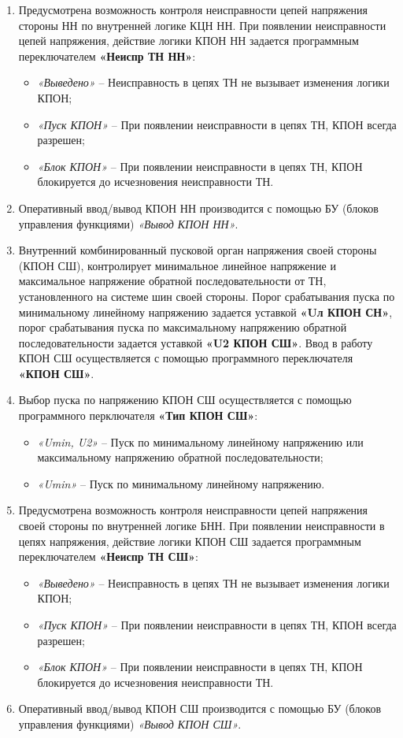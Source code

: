 \begin{enumerate}
\item
Предусмотрена возможность контроля неисправности цепей напряжения стороны НН по внутренней логике КЦН НН. При появлении неисправности цепей напряжения, действие логики КПОН НН задается программным переключателем \textbf{«Неиспр ТН НН»}:
\begin{itemize}
\item \textit{«Выведено»} -- Неисправность в цепях ТН не вызывает изменения логики КПОН;
\item \textit{«Пуск КПОН»} -- При появлении неисправности в цепях ТН, КПОН всегда разрешен;
\item \textit{«Блок КПОН»} -- При появлении неисправности в цепях ТН, КПОН блокируется до исчезновения неисправности ТН.
\end{itemize}

\item
Оперативный ввод/вывод КПОН НН производится с помощью БУ (блоков управления функциями) \textit{«Вывод КПОН НН»}. 

\item
Внутренний комбинированный пусковой орган напряжения своей стороны (КПОН СШ), контролирует минимальное линейное напряжение и максимальное напряжение обратной последовательности от ТН, установленного на системе шин своей стороны. Порог срабатывания пуска по минимальному линейному напряжению задается уставкой \textbf{«Uл КПОН СН»}, порог срабатывания пуска по максимальному напряжению обратной последовательности задается уставкой \textbf{«U2 КПОН СШ»}. Ввод в работу КПОН СШ осуществляется с помощью программного переключателя \textbf{«КПОН СШ»}.

\item
Выбор пуска по напряжению КПОН СШ осуществляется с помощью программного перключателя \textbf{«Тип КПОН СШ»}:
\begin{itemize}
\item \textit{«Umin, U2»} -- Пуск по минимальному линейному напряжению или максимальному напряжению обратной последовательности;
\item \textit{«Umin»} -- Пуск по минимальному линейному напряжению.
\end{itemize}

\item
Предусмотрена возможность контроля неисправности цепей напряжения своей стороны по внутренней логике БНН. При появлении неисправности в цепях напряжения, действие логики КПОН СШ задается программным переключателем \textbf{«Неиспр ТН СШ»}:
\begin{itemize}
\item \textit{«Выведено»} -- Неисправность в цепях ТН не вызывает изменения логики КПОН;
\item \textit{«Пуск КПОН»} -- При появлении неисправности в цепях ТН, КПОН всегда разрешен;
\item \textit{«Блок КПОН»} -- При появлении неисправности в цепях ТН, КПОН блокируется до исчезновения неисправности ТН.
\end{itemize}

\item
Оперативный ввод/вывод КПОН СШ производится с помощью БУ (блоков управления функциями) \textit{«Вывод КПОН СШ»}. 

\end{enumerate}